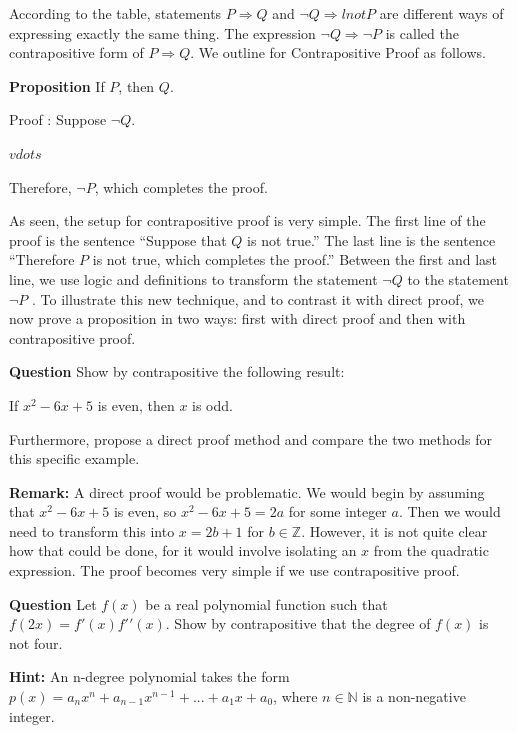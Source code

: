 \documentclass{article}
\begin{document}
According to the table, statements $P \Rightarrow Q$ and $\lnot Q \Rightarrow lnot P$ are different ways of expressing exactly the same thing. The expression $\lnot Q \Rightarrow \lnot P$ is called the contrapositive form of $P \Rightarrow Q$. We outline for Contrapositive Proof as follows.

\begin{tcolorbox}
  \textbf{Proposition} If $P$, then $Q$.
  
  Proof : Suppose $\lnot Q$.
  
  $vdots$
  
  Therefore, $\lnot P$, which completes the proof.
\end{tcolorbox}

As seen, the setup for contrapositive proof is very simple. The first line of the proof is the sentence “Suppose that $Q$ is not true.” The last line is the sentence “Therefore $P$ is not true, which completes the proof.” Between the first and last line, we use logic and definitions to transform the statement $\lnot Q$ to the statement $\lnot P$ . To illustrate this new technique, and to contrast it with direct proof, we now prove a proposition in two ways: first with direct proof and then with contrapositive proof.

\begin{tcolorbox}
  \textbf{Question} Show by contrapositive the following result:
  
  If $x^2 - 6x + 5$ is even, then $x$ is odd. 
  
  Furthermore, propose a direct proof method and compare the two methods for this specific example.
\end{tcolorbox}

\begin{tcolorbox}
  \textbf{Remark:} A direct proof would be problematic. We would begin by assuming that $x^2 - 6x + 5$ is even, so $x^2 - 6x + 5 = 2a$ for some integer $a$. Then we would need to transform this into $x = 2b + 1$ for $b \in \mathbb{Z}$. However, it is not quite clear how that could be done, for it would involve isolating an $x$ from the quadratic expression. The proof becomes very simple if we use contrapositive proof.  
\end{tcolorbox}

\begin{tcolorbox}
  \textbf{Question} Let $f (x)$ be a real polynomial function such that $f (2x) = f \prime(x)f \prime \prime(x)$. Show by contrapositive that the degree of $f (x)$ is not four.
  
  \textbf{Hint:} An n-degree polynomial takes the form $p(x) = a_nx^n + a_{n-1}x^{n-1} + . . . + a_1x + a_0$, where $n \in \mathbb{N}$ is a non-negative integer.
\end{tcolorbox}
\end{document}
